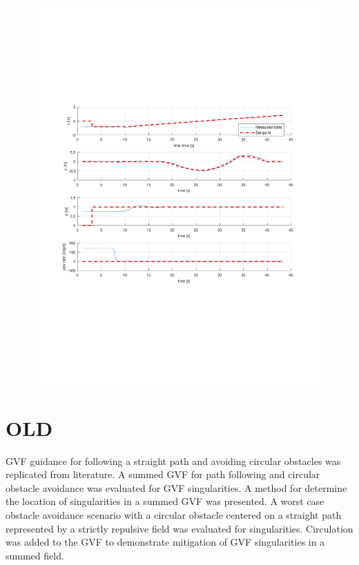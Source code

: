 \documentclass[numbered,pdftex]{ohio-etd}
\begin{document}
\begin{figure}[H]
	\centering
	\includegraphics[trim = 65 200 0 200, clip, width=17cm]{Figures/results/compareFigures/4Controller}
	\caption{}
	\label{fig:4Controller}
\end{figure}




\chapter{OLD}
GVF guidance for following a straight path and avoiding circular obstacles was replicated from literature. A summed GVF for path following and circular obstacle avoidance was evaluated for GVF singularities. A method for determine the location of singularities in a summed GVF was presented. A worst case obstacle avoidance scenario with a circular obstacle centered on a straight path represented by a strictly repulsive field was evaluated for singularities. Circulation was added to the GVF to demonstrate mitigation of GVF singularities in a summed field. 
\end{document}
